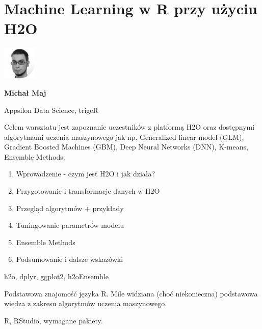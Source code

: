 \documentclass[\main/boa.tex]{subfiles}
\begin{document}
\section{Machine Learning w R przy użyciu H2O}
\begin{minipage}[t]{0.915\textwidth}
	\center     
    \includegraphics[width=60px]{img/workshops/czarno_biale/mmaj-crop.png} 
\end{minipage}

\begin{minipage}{0.915\textwidth}
\centering
{\bf {} Michał Maj}
\end{minipage}

\vskip 0.3cm

\begin{affiliations}
\begin{minipage}{0.915\textwidth}
\centering
\large Appsilon Data Science, trigeR  \\[2pt]
\end{minipage}
\end{affiliations}

\vskip 0.8cm

\opiswarsztatu Celem warsztatu jest zapoznanie uczestników z platformą H2O oraz dostępnymi algorytmami uczenia maszynowego jak np. Generalized linear model (GLM), Gradient Boosted Machines (GBM), Deep Neural Networks (DNN), K-means, Ensemble Methods.

\planwarsztatu
\begin{enumerate}
\item Wprowadzenie - czym jest H2O i jak działa?
\item Przygotowanie i transformacje danych w H2O
\item Przegląd algorytmów + przykłady
\item Tuningowanie parametrów modelu
\item Ensemble Methods
\item Podsumowanie i dalsze wskazówki
\end{enumerate}	 

\pakiety h2o, dplyr, ggplot2, h2oEnsemble

\umiejetnosci Podstawowa znajomość języka R. Mile widziana (choć niekonieczna) podstawowa wiedza z zakresu algorytmów uczenia maszynowego.

\wymagania R, RStudio, wymagane pakiety.
\end{document}

